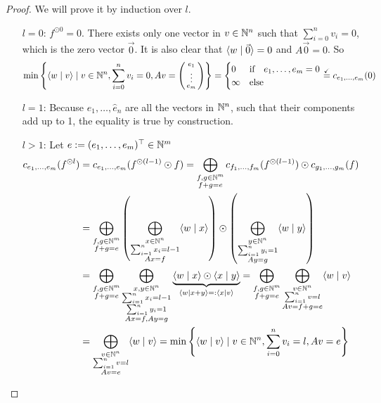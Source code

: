 \begin{proof}
    We will prove it by induction over $l$.
    \begin{itemize}
        \item[$l=0$:] $f^{\odot0} = 0$. There exists only one vector in $v \in \mathbb{N}^n$ such that $\sum_{i=0}^{n}v_i = 0$, which is the zero vector $\vec 0$. It is also clear that $\langle w \mid \vec 0 \rangle= 0$ and $A\vec0=0$. So
        $$
            \min\left\{\langle w \mid v \rangle \mid v \in \mathbb{N}^n, \sum_{i=0}^{n}v_i = 0, Av=\left(\begin{smallmatrix}e_1\\\vdots\\e_m\end{smallmatrix}\right)\right\} = \begin{cases}
                0 &\textrm{if}\quad e_1, \dots, e_m = 0\\
                \infty &\textrm{else}
            \end{cases}
            \stackrel{\checkmark}{=}c_{e_1, \dots, e_m}(0)
        $$
        \item[$l=1$:] Because $\hat e_1, \dots, \hat e_n$ are all the vectors in $\mathbb{N}^n$, such that their components add up to 1, the equality is true by construction.
        \item[$l>1$:] Let $e := (e_1, \dots, e_m)^\top \in \mathbb{N}^m$
        \begin{align*}
            c_{e_1, \dots, e_m}(f^{\odot l}) &= c_{e_1, \dots, e_m}(f^{\odot (l-1)}\odot f) = \bigoplus_{\substack{f, g \in \mathbb{N}^m\\f+g=e}} c_{f_1, \dots, f_m}(f^{\odot (l-1)}) \odot c_{g_1, \dots, g_m}(f)\\
            &= \bigoplus_{\substack{f, g \in \mathbb{N}^m\\f+g=e}} \left(\bigoplus_{\substack{x \in \mathbb{N}^n\\\sum_{i=1}^{n}x_i = l-1\\Ax=f}}\langle w \mid x \rangle\right) \odot \left(\bigoplus_{\substack{y \in \mathbb{N}^n\\\sum_{i=1}^{n}y_i = 1\\Ay=g}}\langle w \mid y \rangle\right)\\
            &= \bigoplus_{\substack{f, g \in \mathbb{N}^m\\f+g=e}}\bigoplus_{\substack{x, y \in \mathbb{N}^n\\\sum_{i=1}^{n}x_i = l-1\\\sum_{i=1}^{n}y_i = 1\\Ax=f, Ay=g}} \underbrace{\langle w \mid x \rangle \odot \langle x \mid y \rangle}_{\langle w \mid x+y \rangle =: \langle x \mid v \rangle} = \bigoplus_{\substack{f, g \in \mathbb{N}^m\\f+g=e}}\bigoplus_{\substack{v \in \mathbb{N}^n\\\sum_{i=1}^{n}v = l\\Av=f+g=e}} \langle w \mid v \rangle\\
            &= \bigoplus_{\substack{v \in \mathbb{N}^n\\\sum_{i=1}^{n}v = l\\Av=e}} \langle w \mid v \rangle = \min\left\{\langle w \mid v \rangle \mid v \in \mathbb{N}^n, \sum_{i=0}^{n}v_i = l, Av=e\right\}
        \end{align*} 
    \end{itemize}
\end{proof}

